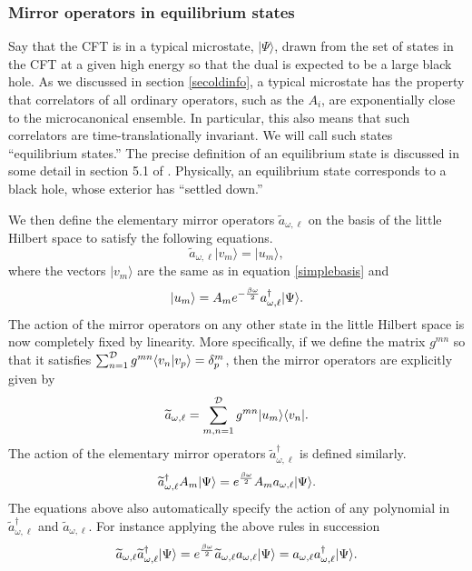 \documentclass[12pt]{article}
\newcommand{\cop}[1]{#1}
\newcommand{\al}{\cop{A}} %
\def\ta{\widetilde{\cop{a}}}
\newcommand{\be}{\begin{equation}}
\newcommand{\ee}{\end{equation}}
\begin{document}
\subsubsection{\bf Mirror operators in equilibrium states}
Say that the CFT is in a typical microstate, $|\Psi \rangle$, drawn from the set of states in the CFT at a given high energy so that the dual is expected to be a large black hole. As we discussed in section \ref{secoldinfo}, a  typical microstate has the property that correlators of all ordinary operators, such as the $\al_i$, are exponentially close to the microcanonical ensemble. In particular, this also means that such correlators are time-translationally invariant. We will call such states ``equilibrium states.''  The precise definition of an equilibrium state is discussed in some detail in section 5.1 of \cite{Papadodimas:2013jku}. Physically, an equilibrium state corresponds to a black hole, whose exterior has ``settled down.''

We then define the elementary mirror operators $\ta_{\omega, \ell}$ on the basis of the little Hilbert space to satisfy the following equations.
\be
\label{taelemdef}
\ta_{\omega, \ell} |v_m \rangle = |u_m \rangle,
\ee
where the vectors $|v_m \rangle$ are the same as in equation \eqref{simplebasis} and
\be
\label{mirroraction}
|u_m \rangle = \al_m e^{-{\beta \omega \over 2}} a_{\omega, \ell}^{\dagger} |\Psi \rangle.
\ee
The action of the mirror operators on any other state in the little Hilbert space is now completely fixed by linearity.
More specifically, if we define the matrix $g^{m n}$  so that it satisfies $\sum_{n=1}^{{\cal D}} g^{m n} \langle v_n | v_p \rangle = \delta^m_p$, then the mirror operators are explicitly given by
\be
\label{taexplicit}
\ta_{\omega, \ell} = \sum_{m,n=1}^{{\cal D}}g^{m n} |u_m \rangle \langle v_n|.
\ee
The action of the elementary mirror operators $\ta_{\omega, \ell}^{\dagger}$ is defined similarly.
\be
\label{tadagdef}
\ta_{\omega, \ell}^{\dagger} \al_m |\Psi \rangle =  e^{\beta \omega \over 2} \al_m a_{\omega, \ell} |\Psi \rangle.
\ee
The equations above also automatically specify the action of any polynomial in $\ta_{\omega, \ell}^{\dagger}$ and $\ta_{\omega, \ell}$. For instance applying the above rules in succession
\be
\label{numbermirror}
\ta_{\omega, \ell} \ta_{\omega, \ell}^{\dagger} |\Psi \rangle =  e^{\beta \omega \over 2} \ta_{\omega, \ell} a_{\omega, \ell} |\Psi \rangle = a_{\omega, \ell} a^{\dagger}_{\omega, \ell} |\Psi \rangle.
\ee
\end{document}
